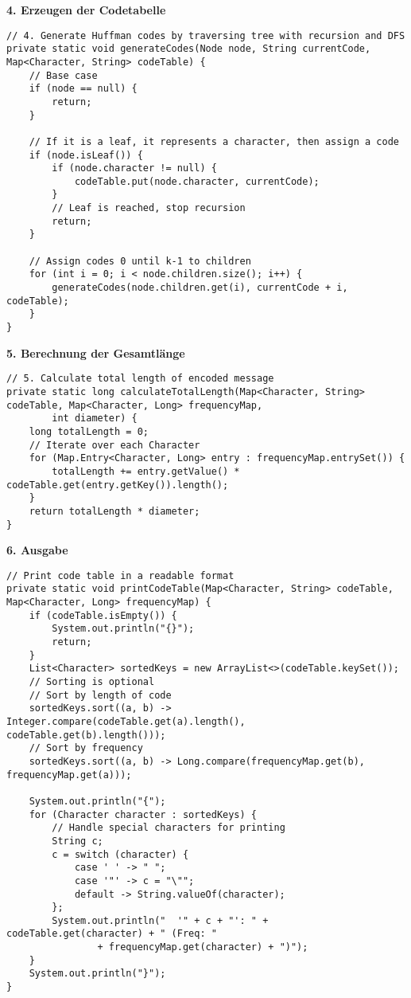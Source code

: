 \documentclass[a4paper,10pt,ngerman]{scrartcl}
\begin{document}
\textbf{4. Erzeugen der Codetabelle}
\begin{lstlisting}
// 4. Generate Huffman codes by traversing tree with recursion and DFS
private static void generateCodes(Node node, String currentCode, Map<Character, String> codeTable) {
    // Base case
    if (node == null) {
        return;
    }

    // If it is a leaf, it represents a character, then assign a code
    if (node.isLeaf()) {
        if (node.character != null) {
            codeTable.put(node.character, currentCode);
        }
        // Leaf is reached, stop recursion
        return;
    }

    // Assign codes 0 until k-1 to children
    for (int i = 0; i < node.children.size(); i++) {
        generateCodes(node.children.get(i), currentCode + i, codeTable);
    }
}
\end{lstlisting}

\textbf{5. Berechnung der Gesamtlänge}
\begin{lstlisting}
// 5. Calculate total length of encoded message
private static long calculateTotalLength(Map<Character, String> codeTable, Map<Character, Long> frequencyMap,
        int diameter) {
    long totalLength = 0;
    // Iterate over each Character
    for (Map.Entry<Character, Long> entry : frequencyMap.entrySet()) {
        totalLength += entry.getValue() * codeTable.get(entry.getKey()).length();
    }
    return totalLength * diameter;
}
\end{lstlisting}

\textbf{6. Ausgabe}
\begin{lstlisting}
// Print code table in a readable format
private static void printCodeTable(Map<Character, String> codeTable, Map<Character, Long> frequencyMap) {
    if (codeTable.isEmpty()) {
        System.out.println("{}");
        return;
    }
    List<Character> sortedKeys = new ArrayList<>(codeTable.keySet());
    // Sorting is optional
    // Sort by length of code
    sortedKeys.sort((a, b) -> Integer.compare(codeTable.get(a).length(), codeTable.get(b).length()));
    // Sort by frequency
    sortedKeys.sort((a, b) -> Long.compare(frequencyMap.get(b), frequencyMap.get(a)));

    System.out.println("{");
    for (Character character : sortedKeys) {
        // Handle special characters for printing
        String c;
        c = switch (character) {
            case ' ' -> " ";
            case '"' -> c = "\"";
            default -> String.valueOf(character);
        };
        System.out.println("  '" + c + "': " + codeTable.get(character) + " (Freq: "
                + frequencyMap.get(character) + ")");
    }
    System.out.println("}");
}
\end{lstlisting}
\end{document}
